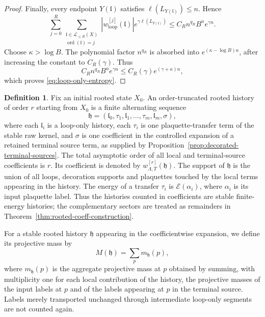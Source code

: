 \documentclass[11pt,a4paper,reqno]{amsart}
\theoremstyle{definition}
\newtheorem{definition}[theorem]{Definition}
\theoremstyle{remark}
\begin{document}
\begin{proof}
Finally, every endpoint $Y(\mathfrak l)$ satisfies $\ell(L_{Y(\mathfrak l)})\le n$.  Hence
\[
\sum_{j=0}^R\sum_{\substack{\mathfrak l\in\mathcal L_{\le R}(X)\\
\operatorname{ord}(\mathfrak l)=j}}
|w^{[j]}_{\mathrm{loop}}(\mathfrak l)| e^{\gamma\ell(L_{Y(\mathfrak l)})}
\le C_R n^{q_R}B^n e^{\gamma n}.
\]
Choose $\kappa>\log B$.  The polynomial factor $n^{q_R}$ is absorbed into $e^{(\kappa-\log B)n}$, after increasing the constant to $C_R(\gamma)$.  Thus
\[
C_R n^{q_R}B^n e^{\gamma n}
\le C_R(\gamma)e^{(\gamma+\kappa)n},
\]
which proves \eqref{eq:loop-only-entropy}.
\end{proof}

\begin{definition}
Fix an initial rooted state $X_0$.  An order-truncated rooted history of order $r$ starting from $X_0$ is a finite alternating sequence
\[
\mathfrak h=(\mathfrak l_0,\tau_1,\mathfrak l_1,\ldots,\tau_m,\mathfrak l_m,\sigma),
\]
where each $\mathfrak l_i$ is a loop-only history, each $\tau_i$ is one plaquette-transfer term of the stable raw kernel, and $\sigma$ is one coefficient in the controlled expansion of a retained terminal source term, as supplied by Proposition~\ref{prop:decorated-terminal-sources}.  The total asymptotic order of all local and terminal-source coefficients is $r$.  Its coefficient is denoted by $w^{[r]}_{\Lambda,T}(\mathfrak h)$.  The support of $\mathfrak h$ is the union of all loops, decoration supports and plaquettes touched by the local terms appearing in the history.  The energy of a transfer $\tau_i$ is $\mathcal E(\alpha_i)$, where $\alpha_i$ is its input plaquette label.  Thus the histories counted in coefficients are stable finite-energy histories; the complementary sectors are treated as remainders in Theorem~\ref{thm:rooted-coeff-construction}.
\end{definition}

For a stable rooted history $\mathfrak h$ appearing in the coefficientwise expansion, we define its projective mass by
\[
M(\mathfrak h)=\sum_p m_{\mathfrak h}(p),
\]
where $m_{\mathfrak h}(p)$ is the aggregate projective mass at $p$ obtained by summing, with multiplicity one for each local contribution of the history, the projective masses of the input labels at $p$ and of the labels appearing at $p$ in the terminal source. Labels merely transported unchanged through intermediate loop-only segments are not counted again.
\end{document}
